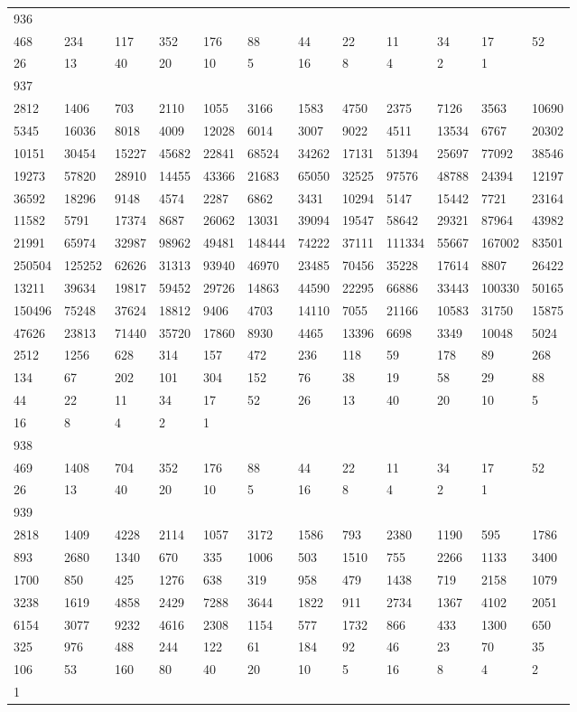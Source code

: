 \begin{longtable}{llllllllllll}
936&&&&&&&&&&&\\
468& 234& 117& 352& 176& 88& 44& 22& 11& 34& 17& 52\\
26& 13& 40& 20& 10& 5& 16& 8& 4& 2& 1& \\

937&&&&&&&&&&&\\
2812& 1406& 703& 2110& 1055& 3166& 1583& 4750& 2375& 7126& 3563& 10690\\
5345& 16036& 8018& 4009& 12028& 6014& 3007& 9022& 4511& 13534& 6767& 20302\\
10151& 30454& 15227& 45682& 22841& 68524& 34262& 17131& 51394& 25697& 77092& 38546\\
19273& 57820& 28910& 14455& 43366& 21683& 65050& 32525& 97576& 48788& 24394& 12197\\
36592& 18296& 9148& 4574& 2287& 6862& 3431& 10294& 5147& 15442& 7721& 23164\\
11582& 5791& 17374& 8687& 26062& 13031& 39094& 19547& 58642& 29321& 87964& 43982\\
21991& 65974& 32987& 98962& 49481& 148444& 74222& 37111& 111334& 55667& 167002& 83501\\
250504& 125252& 62626& 31313& 93940& 46970& 23485& 70456& 35228& 17614& 8807& 26422\\
13211& 39634& 19817& 59452& 29726& 14863& 44590& 22295& 66886& 33443& 100330& 50165\\
150496& 75248& 37624& 18812& 9406& 4703& 14110& 7055& 21166& 10583& 31750& 15875\\
47626& 23813& 71440& 35720& 17860& 8930& 4465& 13396& 6698& 3349& 10048& 5024\\
2512& 1256& 628& 314& 157& 472& 236& 118& 59& 178& 89& 268\\
134& 67& 202& 101& 304& 152& 76& 38& 19& 58& 29& 88\\
44& 22& 11& 34& 17& 52& 26& 13& 40& 20& 10& 5\\
16& 8& 4& 2& 1& \\

938&&&&&&&&&&&\\
469& 1408& 704& 352& 176& 88& 44& 22& 11& 34& 17& 52\\
26& 13& 40& 20& 10& 5& 16& 8& 4& 2& 1& \\

939&&&&&&&&&&&\\
2818& 1409& 4228& 2114& 1057& 3172& 1586& 793& 2380& 1190& 595& 1786\\
893& 2680& 1340& 670& 335& 1006& 503& 1510& 755& 2266& 1133& 3400\\
1700& 850& 425& 1276& 638& 319& 958& 479& 1438& 719& 2158& 1079\\
3238& 1619& 4858& 2429& 7288& 3644& 1822& 911& 2734& 1367& 4102& 2051\\
6154& 3077& 9232& 4616& 2308& 1154& 577& 1732& 866& 433& 1300& 650\\
325& 976& 488& 244& 122& 61& 184& 92& 46& 23& 70& 35\\
106& 53& 160& 80& 40& 20& 10& 5& 16& 8& 4& 2\\
1& \\


\end{longtable}
